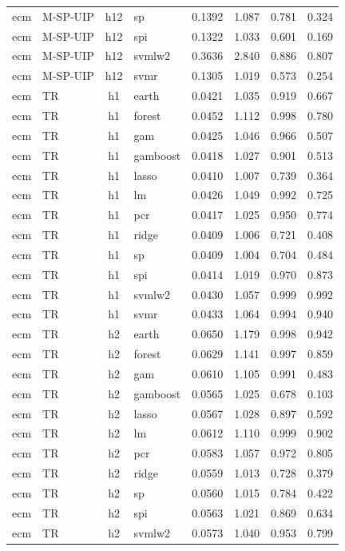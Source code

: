 \begin{ThreePartTable}
\begin{longtable}[t]{llclcccc}
ecm & M-SP-UIP & h12 & sp & 0.1392 & 1.087 & 0.781 & 0.324\\
ecm & M-SP-UIP & h12 & spi & 0.1322 & 1.033 & 0.601 & 0.169\\
ecm & M-SP-UIP & h12 & svmlw2 & 0.3636 & 2.840 & 0.886 & 0.807\\
ecm & M-SP-UIP & h12 & svmr & 0.1305 & 1.019 & 0.573 & 0.254\\
\addlinespace
ecm & TR & h1 & earth & 0.0421 & 1.035 & 0.919 & 0.667\\
ecm & TR & h1 & forest & 0.0452 & 1.112 & 0.998 & 0.780\\
ecm & TR & h1 & gam & 0.0425 & 1.046 & 0.966 & 0.507\\
ecm & TR & h1 & gamboost & 0.0418 & 1.027 & 0.901 & 0.513\\
ecm & TR & h1 & lasso & 0.0410 & 1.007 & 0.739 & 0.364\\
ecm & TR & h1 & lm & 0.0426 & 1.049 & 0.992 & 0.725\\
ecm & TR & h1 & pcr & 0.0417 & 1.025 & 0.950 & 0.774\\
ecm & TR & h1 & ridge & 0.0409 & 1.006 & 0.721 & 0.408\\
ecm & TR & h1 & sp & 0.0409 & 1.004 & 0.704 & 0.484\\
ecm & TR & h1 & spi & 0.0414 & 1.019 & 0.970 & 0.873\\
ecm & TR & h1 & svmlw2 & 0.0430 & 1.057 & 0.999 & 0.992\\
ecm & TR & h1 & svmr & 0.0433 & 1.064 & 0.994 & 0.940\\
\addlinespace
ecm & TR & h2 & earth & 0.0650 & 1.179 & 0.998 & 0.942\\
ecm & TR & h2 & forest & 0.0629 & 1.141 & 0.997 & 0.859\\
ecm & TR & h2 & gam & 0.0610 & 1.105 & 0.991 & 0.483\\
ecm & TR & h2 & gamboost & 0.0565 & 1.025 & 0.678 & 0.103\\
ecm & TR & h2 & lasso & 0.0567 & 1.028 & 0.897 & 0.592\\
ecm & TR & h2 & lm & 0.0612 & 1.110 & 0.999 & 0.902\\
ecm & TR & h2 & pcr & 0.0583 & 1.057 & 0.972 & 0.805\\
ecm & TR & h2 & ridge & 0.0559 & 1.013 & 0.728 & 0.379\\
ecm & TR & h2 & sp & 0.0560 & 1.015 & 0.784 & 0.422\\
ecm & TR & h2 & spi & 0.0563 & 1.021 & 0.869 & 0.634\\
ecm & TR & h2 & svmlw2 & 0.0573 & 1.040 & 0.953 & 0.799\\

\end{longtable}
\end{ThreePartTable}
